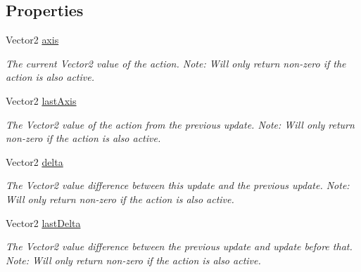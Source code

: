 \subsection*{Properties}
\begin{DoxyCompactItemize}
\item 
Vector2 \mbox{\hyperlink{class_valve_1_1_v_r_1_1_steam_v_r___action___vector2___source_a40cabbc9975979dbbd1b062ed5000a76}{axis}}
\begin{DoxyCompactList}\small\item\em The current Vector2 value of the action. Note\+: Will only return non-\/zero if the action is also active. \end{DoxyCompactList}\item 
Vector2 \mbox{\hyperlink{class_valve_1_1_v_r_1_1_steam_v_r___action___vector2___source_aafd1e951222e420aabc63773f158f741}{last\+Axis}}
\begin{DoxyCompactList}\small\item\em The Vector2 value of the action from the previous update. Note\+: Will only return non-\/zero if the action is also active. \end{DoxyCompactList}\item 
Vector2 \mbox{\hyperlink{class_valve_1_1_v_r_1_1_steam_v_r___action___vector2___source_aacfb4b6fdcbfa8ccccc4a4b78dd64e6e}{delta}}
\begin{DoxyCompactList}\small\item\em The Vector2 value difference between this update and the previous update. Note\+: Will only return non-\/zero if the action is also active. \end{DoxyCompactList}\item 
Vector2 \mbox{\hyperlink{class_valve_1_1_v_r_1_1_steam_v_r___action___vector2___source_ad85707f63e96209405cb1b2a67ffb1dc}{last\+Delta}}
\begin{DoxyCompactList}\small\item\em The Vector2 value difference between the previous update and update before that. Note\+: Will only return non-\/zero if the action is also active. \end{DoxyCompactList}\item 

\end{DoxyCompactItemize}
